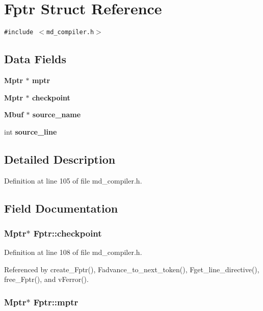 \section{Fptr Struct Reference}
\label{structFptr}
{\tt \#include $<$md\_\-compiler.h$>$}

\subsection*{Data Fields}
\begin{CompactItemize}
\item 
\bf{Mptr} $\ast$ \bf{mptr}
\item 
\bf{Mptr} $\ast$ \bf{checkpoint}
\item 
\bf{Mbuf} $\ast$ \bf{source\_\-name}
\item 
int \bf{source\_\-line}
\end{CompactItemize}


\subsection{Detailed Description}




Definition at line 105 of file md\_\-compiler.h.

\subsection{Field Documentation}
\subsubsection{\setlength{\rightskip}{0pt plus 5cm}\bf{Mptr}$\ast$ \bf{Fptr::checkpoint}}\label{structFptr_7252c599b20902b03825e5a9e977353b}




Definition at line 108 of file md\_\-compiler.h.

Referenced by create\_\-Fptr(), Fadvance\_\-to\_\-next\_\-token(), Fget\_\-line\_\-directive(), free\_\-Fptr(), and v\-Ferror().
\subsubsection{\setlength{\rightskip}{0pt plus 5cm}\bf{Mptr}$\ast$ \bf{Fptr::mptr}}\label{structFptr_3e61b13d0cce1ed75ce08ba56a497b8e}




